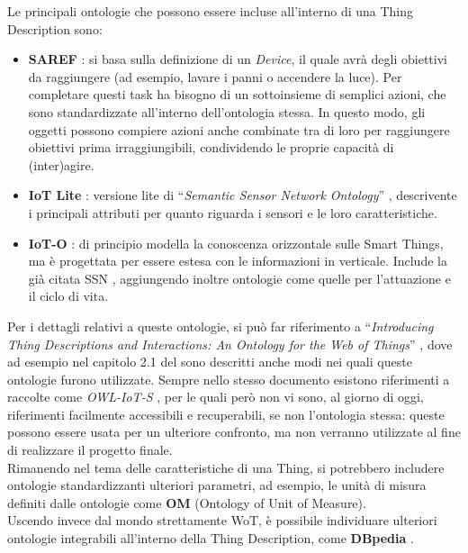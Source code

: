 \documentclass[12pt,a4paper,openright,oneside]{report}
\newcommand{\quotes}[1]{``#1''}
\begin{document}
Le principali ontologie che possono essere incluse all'interno di una Thing Description sono:
\begin{itemize}
	\item \textbf{SAREF} \cite{saref}: si basa sulla definizione di un \textit{Device}, il quale avrà degli obiettivi da raggiungere (ad esempio, lavare i panni o accendere la luce). Per completare questi task ha bisogno di un sottoinsieme di semplici azioni, che sono standardizzate all'interno dell'ontologia stessa. In questo modo, gli oggetti possono compiere azioni anche combinate tra di loro per raggiungere obiettivi prima irraggiungibili, condividendo le proprie capacità di (inter)agire.
	
	\item \textbf{IoT Lite} \cite{iot-lite}: versione lite di \quotes{\textit{Semantic Sensor Network Ontology}} \cite{ssno}, descrivente i principali attributi per quanto riguarda i sensori e le loro caratteristiche.
	
	\item \textbf{IoT-O} \cite{ioto}\cite{iot-paper}: di principio modella la conoscenza orizzontale sulle Smart Things, ma è progettata per essere estesa con le informazioni in verticale. Include la già citata SSN \cite{ssno}, aggiungendo inoltre ontologie come quelle per l'attuazione e il ciclo di vita.

\end{itemize}

Per i dettagli relativi a queste ontologie, si può far riferimento a  \quotes{\textit{Introducing Thing Descriptions and Interactions: An Ontology for the Web of Things}} \cite{td-paper2}, dove ad esempio nel capitolo 2.1 del sono descritti anche modi nei quali queste ontologie furono utilizzate. Sempre nello stesso documento esistono riferimenti a raccolte come \textit{OWL-IoT-S} \cite{owliot}, per le quali però non vi sono, al giorno di oggi, riferimenti facilmente accessibili e recuperabili, se non l'ontologia stessa: queste possono essere usata per un ulteriore confronto, ma non verranno utilizzate al fine di realizzare il progetto finale.\\

Rimanendo nel tema delle caratteristiche di una Thing, si potrebbero includere ontologie standardizzanti ulteriori parametri, ad esempio, le unità di misura definiti dalle ontologie come \textbf{OM} (Ontology of Unit of Measure).\\

Uscendo invece dal mondo strettamente WoT, è possibile individuare ulteriori ontologie integrabili all'interno della Thing Description, come \textbf{DBpedia} \cite{dbpedia}.
\end{document}
